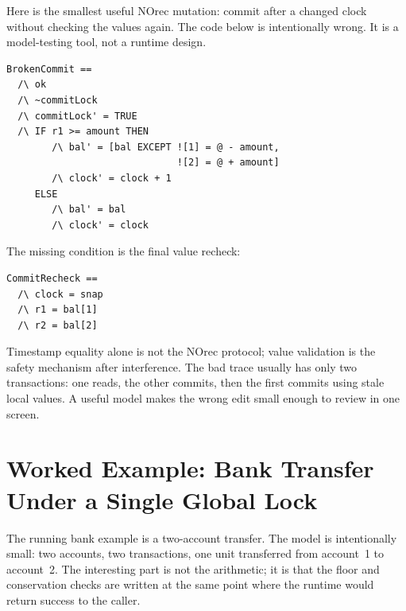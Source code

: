 Here is the smallest useful NOrec mutation: commit after a changed clock without
checking the values again.  The code below is intentionally wrong.  It is a
model-testing tool, not a runtime design.

\begin{lstlisting}[caption={A deliberately broken NOrec-style commit action.}, label={lst:broken-commit}]
BrokenCommit ==
  /\ ok
  /\ ~commitLock
  /\ commitLock' = TRUE
  /\ IF r1 >= amount THEN
        /\ bal' = [bal EXCEPT ![1] = @ - amount,
                              ![2] = @ + amount]
        /\ clock' = clock + 1
     ELSE
        /\ bal' = bal
        /\ clock' = clock
\end{lstlisting}

The missing condition is the final value recheck:

\begin{lstlisting}[caption={The commit guard that the broken action omitted.}, label={lst:commit-recheck}]
CommitRecheck ==
  /\ clock = snap
  /\ r1 = bal[1]
  /\ r2 = bal[2]
\end{lstlisting}

Timestamp equality alone is not the NOrec protocol; value validation is
the safety mechanism after interference.  The bad trace usually has only two
transactions: one reads, the other commits, then the first commits using stale
local values.  A useful model makes the wrong edit small enough to review in one
screen.

\section{Worked Example: Bank Transfer Under a Single Global Lock}

The running bank example is a two-account transfer.  The model is intentionally
small: two accounts, two transactions, one unit transferred from account~1 to
account~2.  The interesting part is not the arithmetic; it is that the floor
and conservation checks are written at the same point where the runtime would
return success to the caller.

